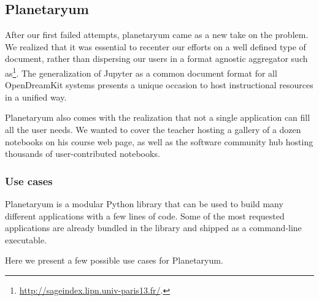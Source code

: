 \hypertarget{planetaryum}{%
\subsection{Planetaryum}\label{planetaryum}}

After our first failed attempts, planetaryum came as a new take on the
problem. We realized that it was essential to recenter our efforts on a
well defined type of document, rather than dispersing our users in a
format agnostic aggregator such as\footnote{\url{http://sageindex.lipn.univ-paris13.fr/}.}.
The generalization of Jupyter as a common document format for all
OpenDreamKit systems presents a unique occasion to host instructional
resources in a unified way.

Planetaryum also comes with the realization that not a single
application can fill all the user needs. We wanted to cover the teacher
hosting a gallery of a dozen notebooks on his course web page, as well
as the software community hub hosting thousands of user-contributed
notebooks.

\hypertarget{use-cases}{%
\subsubsection{Use cases}\label{use-cases}}

Planetaryum is a modular Python library that can be used to build many
different applications with a few lines of code. Some of the most
requested applications are already bundled in the library and shipped as
a command-line executable.

Here we present a few possible use cases for Planetaryum.

